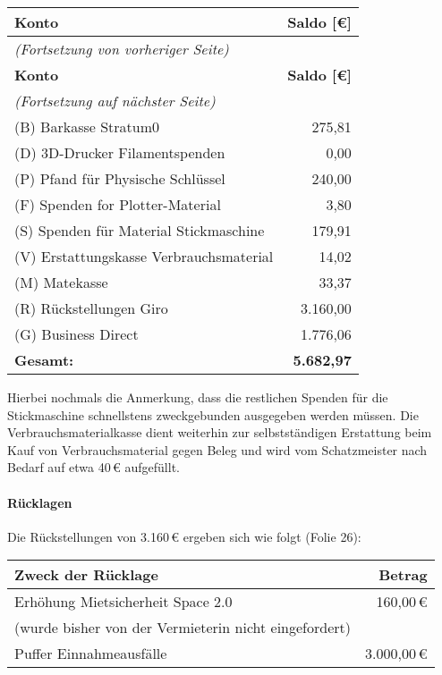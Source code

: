 \documentclass[parskip=half-]{s0minutes}
\begin{document}
\begin{longtable}{|l|r|}
  \hline
  \textbf{Konto} & \textbf{Saldo [€]} \\
  \hline
  \endfirsthead
  \multicolumn{2}{l}{\emph{(Fortsetzung von vorheriger Seite)}} \\
  \hline
  \textbf{Konto} & \textbf{Saldo [€]} \\
  \hline
  \endhead
  \multicolumn{2}{l}{\emph{(Fortsetzung auf nächster Seite)}} \\
  \endfoot
  \endlastfoot
  (B) Barkasse Stratum0                    &     275{,}81 \\
  (D) 3D-Drucker Filamentspenden           &       0{,}00 \\
  (P) Pfand für Physische Schlüssel        &     240{,}00 \\
  (F) Spenden for Plotter-Material         &       3{,}80 \\
  (S) Spenden für Material Stickmaschine   &     179{,}91 \\
  (V) Erstattungskasse Verbrauchsmaterial  &      14{,}02 \\
  (M) Matekasse                            &      33{,}37 \\
  (R) Rückstellungen Giro                  & 3{.}160{,}00 \\
  (G) Business Direct                      & 1{.}776{,}06 \\
  \hline
	\textbf{Gesamt:}                 & \textbf{5{.}682{,}97} \\
  \hline
\end{longtable}

Hierbei nochmals die Anmerkung, dass die restlichen Spenden für die Stickmaschine
schnellstens zweckgebunden ausgegeben werden müssen. Die Verbrauchsmaterialkasse
dient weiterhin zur selbstständigen Erstattung beim Kauf von Verbrauchsmaterial
gegen Beleg und wird vom Schatzmeister nach Bedarf auf etwa 40\,€ aufgefüllt.

\paragraph{Rücklagen}
Die Rückstellungen von 3{.}160\,€ ergeben sich wie folgt (Folie 26):

\begin{center}
\begin{longtable}{|l|r|}
  \hline
  \textbf{Zweck der Rücklage} & \textbf{Betrag} \\
  \hline
  Erhöhung Mietsicherheit Space 2.0 &     160{,}00\,€ \\
  \qquad (wurde bisher von der Vermieterin nicht eingefordert) & \\
  Puffer Einnahmeausfälle           & 3{.}000{,}00\,€ \\
  \hline
\end{longtable}
\end{center}
\end{document}
